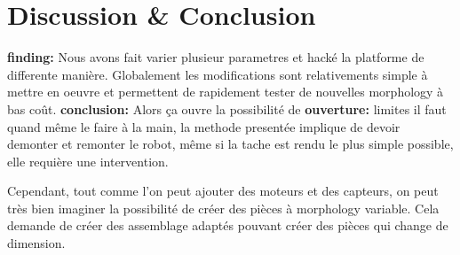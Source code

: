 




\section{Discussion \& Conclusion} %
\textbf{finding:} Nous avons fait varier plusieur parametres et hacké la platforme de differente manière. Globalement les modifications sont relativements simple à mettre en oeuvre et permettent de rapidement tester de nouvelles morphology à bas coût.
\textbf{conclusion:} Alors ça ouvre la possibilité de
\textbf{ouverture:}
limites il faut quand même le faire à la main, la methode presentée implique de devoir demonter et remonter le robot, même si la tache est rendu le plus simple possible, elle requière une intervention.

Cependant, tout comme l'on peut ajouter des moteurs et des capteurs, on peut très bien imaginer la possibilité de créer des pièces à morphology variable. Cela demande de créer des assemblage adaptés pouvant créer des pièces qui change de dimension.
